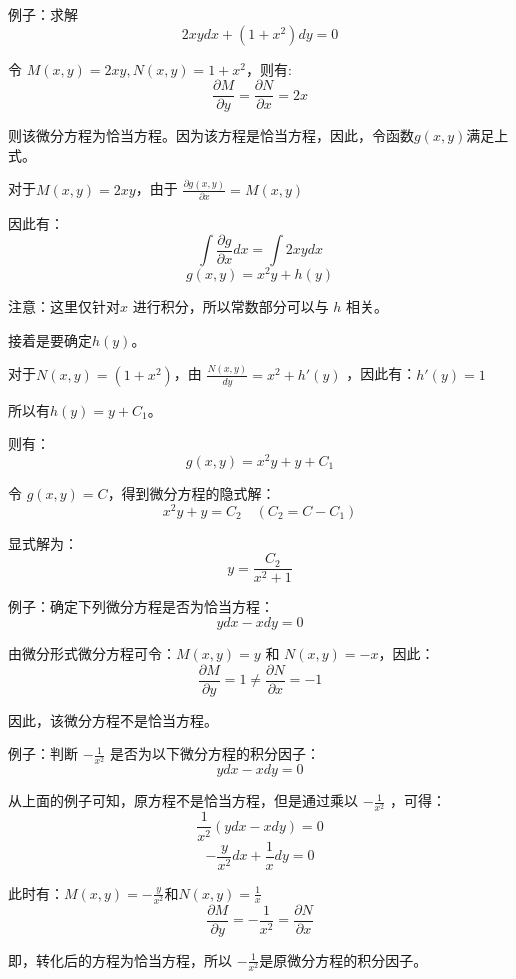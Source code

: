 \documentclass[12pt]{article}
\begin{document}
\begin{framed}  
例子：求解
$$
2xydx + (1+x^2)dy = 0
$$

令 $M(x,y) = 2xy, N(x,y) = 1+x^2$，则有:
$$
\frac{\partial M}{\partial y} = \frac{\partial N}{\partial x} = 2x
$$

则该微分方程为恰当方程。因为该方程是恰当方程，因此，令函数$g(x,y)$满足上式。

对于$M(x,y) = 2xy$，由于 $\frac{\partial g(x,y)}{\partial x} = M(x,y)$

因此有：
$$
\int \frac{\partial g}{\partial x}dx = \int 2xydx
$$
$$
g(x,y) = x^2y+h(y)
$$

注意：这里仅针对$x$ 进行积分，所以常数部分可以与 $h$ 相关。

接着是要确定$h(y)$。

对于$N(x,y) = (1+x^2)$，由 $\frac{N(x,y)}{dy} = x^2 + h'(y)$ ，因此有：$h'(y) = 1$

所以有$h(y) = y + C_1$。

则有：
$$
g(x,y) = x^2y + y + C_1
$$

令 $g(x,y) = C$，得到微分方程的隐式解：
$$
x^2y + y = C_2 \quad (C_2 = C - C_1)
$$

显式解为：
$$
y = \frac{C_2}{x^2 + 1}
$$
\end{framed}

\begin{framed}  
例子：确定下列微分方程是否为恰当方程：
$$
ydx - xdy = 0
$$

由微分形式微分方程可令：$M(x,y) = y$ 和 $N(x,y) = -x$，因此：
$$
\frac{\partial M}{\partial y} = 1 \neq \frac{\partial N}{\partial x} = -1
$$

因此，该微分方程不是恰当方程。
\end{framed}

\begin{framed}  
例子：判断 $-\frac{1}{x^2}$ 是否为以下微分方程的积分因子：
$$
ydx - xdy = 0
$$

从上面的例子可知，原方程不是恰当方程，但是通过乘以 $-\frac{1}{x^2}$ ，可得：
$$
\frac{1}{x^2}(ydx - xdy) = 0
$$
$$
-\frac{y}{x^2}dx + \frac{1}{x}dy = 0
$$

此时有：$M(x,y) = -\frac{y}{x^2}$和$N(x,y) = \frac{1}{x}$
$$
\frac{\partial M}{\partial y} = -\frac{1}{x^2} = \frac{\partial N}{\partial x}
$$

即，转化后的方程为恰当方程，所以 $-\frac{1}{x^2}$是原微分方程的积分因子。
\end{framed}
\end{document}
